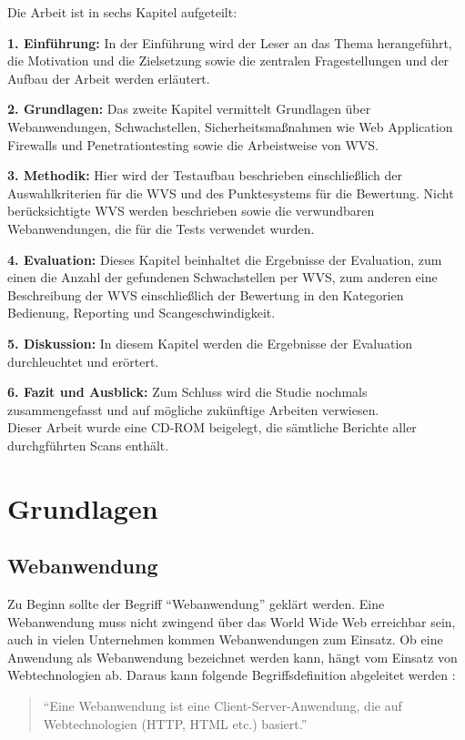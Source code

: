 \documentclass[12pt,oneside,a4paper,parskip,pointlessnumbers]{scrbook}
\begin{document}
Die Arbeit ist in sechs Kapitel aufgeteilt:

\textbf{1. Einführung:} In der Einführung wird der Leser an das Thema herangeführt, die Motivation und die Zielsetzung  sowie die zentralen Fragestellungen und der Aufbau der Arbeit werden erläutert.

\textbf{2. Grundlagen:} Das zweite Kapitel vermittelt Grundlagen über Webanwendungen, Schwachstellen,  Sicherheitsmaßnahmen wie Web Application Firewalls und Penetrationtesting sowie die Arbeistweise von WVS.

\textbf{3. Methodik:} Hier wird der Testaufbau beschrieben einschließlich der Auswahlkriterien für die WVS und des Punktesystems für die Bewertung. Nicht berücksichtigte WVS werden beschrieben sowie die verwundbaren Webanwendungen, die für die Tests verwendet wurden.

\textbf{4. Evaluation:} Dieses Kapitel beinhaltet die Ergebnisse der Evaluation, zum einen die Anzahl der gefundenen Schwachstellen per WVS, zum anderen eine Beschreibung der WVS einschließlich der Bewertung in den Kategorien Bedienung, Reporting und Scangeschwindigkeit.



\textbf{5. Diskussion:} In diesem Kapitel werden die Ergebnisse der Evaluation durchleuchtet und erörtert.


\textbf{6. Fazit und Ausblick:} Zum Schluss wird die Studie nochmals zusammengefasst und auf mögliche zukünftige Arbeiten verwiesen.\\

Dieser Arbeit wurde eine CD-ROM beigelegt, die sämtliche Berichte aller durchgführten Scans enthält.

\chapter{Grundlagen}
  \section{Webanwendung}
  Zu Beginn sollte der Begriff ``Webanwendung'' geklärt werden.
  Eine Webanwendung muss nicht zwingend über das World Wide Web erreichbar sein, auch in vielen Unternehmen kommen Webanwendungen zum Einsatz. Ob eine Anwendung als Webanwendung bezeichnet werden kann, hängt vom Einsatz von Webtechnologien ab. Daraus kann folgende Begriffsdefinition abgeleitet werden \cite[S.1]{Rohr}:

  \begin{quote}``Eine Webanwendung ist eine Client-Server-Anwendung, die auf Webtechnologien (HTTP, HTML etc.) basiert.''\end{quote}
\end{document}
